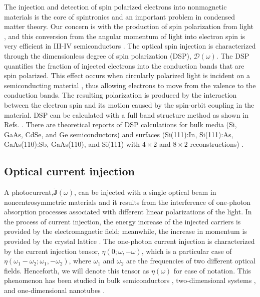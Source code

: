 \documentclass[pss]{wiley2sp} %
\begin{document}
The injection and detection of spin polarized electrons into nonmagnetic
materials is the core of spintronics \cite{vzuticRMP04,fertRMP08} and an
important problem in condensed matter theory. Our concern is with the
production of spin polarization from light \cite{LampelPRL68}, and this
conversion from the angular momentum of light into electron spin is very
efficient in III-IV semiconductors \cite{dyakonovOO84}. The optical spin
injection is characterized through the dimensionless degree of spin polarization (DSP),
$\boldsymbol{\mathcal{D}}(\omega)$. The DSP quantifies the fraction of injected
electrons into the conduction bands that are spin polarized. This effect
occurs when circularly polarized light is incident on a semiconducting
material \cite{dyakonovOO84}, thus allowing electrons to move from the valence
to the conduction bands. The resulting polarization is produced by the
interaction between the electron spin and its motion caused by the spin-orbit
coupling in the material. DSP can be calculated with a full band structure
method as shown in Refs. \cite{nastosPRB07,cabellosPRB09}. There are theoretical reports of DSP
calculations for bulk media (Si, GaAs, CdSe, and Ge semiconductors)
\cite{nastosPRB07,cabellosPRB09} and surfaces (Si(111):In, Si(111):As,
GaAs(110):Sb, GaAs(110), and Si(111) with $4\times2$ and $8\times2$
reconstructions) \cite{mendozaPRB12,arzatePRB14}.


\subsection{Optical current injection}

A photocurrent,$\mathbf{\dot{J}}(\omega)$, can be injected with a single optical beam in noncentrosymmetric materials and it results from
the interference of one-photon absorption processes associated with different
linear polarizations of the light. In the process of current injection, the
energy increase of the injected carriers is provided by the electromagnetic
field; meanwhile, the increase in momentum is provided by the crystal lattice
\cite{arzatePRB14}. The one-photon current injection is characterized by the current injection tensor, $\eta(0;\omega,−\omega)$, which is a particular case of $\eta(\omega_{1}-\omega_{2};\omega_{1},-\omega_{2})$, where $\omega_{1}$ and $\omega_{2}$ are the frequencies of two different optical fields. Henceforth, we will denote this tensor as $\eta(\omega)$ for ease of notation.
This phenomenon has been studied in bulk semiconductors
\cite{hachePRL97,sipePRB00}, two-dimensional systems
\cite{melePRB00,cabellosPRB11}, and one-dimensional nanotubes
\cite{melePRB00}. 
\end{document}
